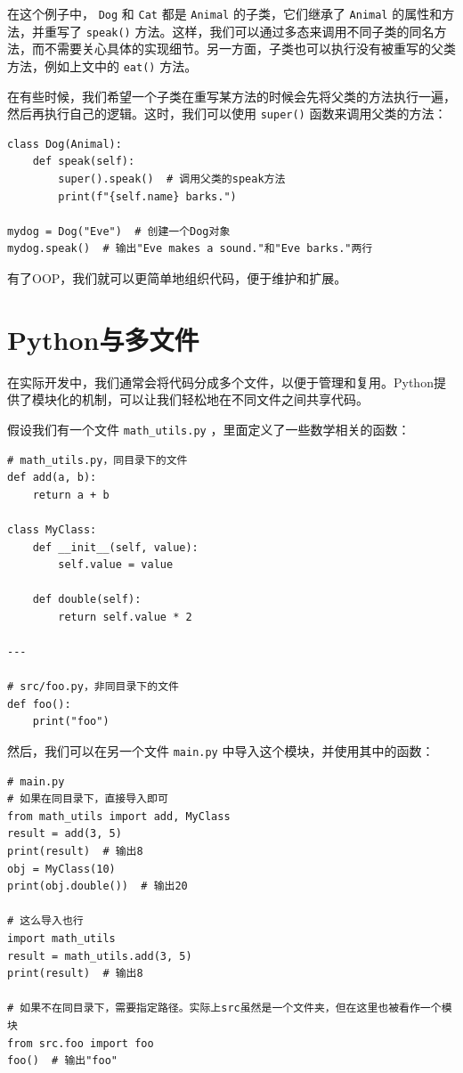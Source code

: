 在这个例子中， \texttt{Dog} 和 \texttt{Cat} 都是 \texttt{Animal} 的子类，它们继承了 \texttt{Animal} 的属性和方法，并重写了 \texttt{speak()} 方法。这样，我们可以通过多态来调用不同子类的同名方法，而不需要关心具体的实现细节。另一方面，子类也可以执行没有被重写的父类方法，例如上文中的 \texttt{eat()} 方法。

在有些时候，我们希望一个子类在重写某方法的时候会先将父类的方法执行一遍，然后再执行自己的逻辑。这时，我们可以使用 \texttt{super()} 函数来调用父类的方法：
\begin{verbatim}
class Dog(Animal):
    def speak(self):
        super().speak()  # 调用父类的speak方法
        print(f"{self.name} barks.")

mydog = Dog("Eve")  # 创建一个Dog对象
mydog.speak()  # 输出"Eve makes a sound."和"Eve barks."两行
\end{verbatim}

有了OOP，我们就可以更简单地组织代码，便于维护和扩展。

\section{Python与多文件}

在实际开发中，我们通常会将代码分成多个文件，以便于管理和复用。Python提供了模块化的机制，可以让我们轻松地在不同文件之间共享代码。

假设我们有一个文件 \texttt{math\_utils.py} ，里面定义了一些数学相关的函数：
\begin{verbatim}
# math_utils.py，同目录下的文件
def add(a, b):
    return a + b

class MyClass:
    def __init__(self, value):
        self.value = value

    def double(self):
        return self.value * 2

---

# src/foo.py，非同目录下的文件
def foo():
    print("foo")
\end{verbatim}

然后，我们可以在另一个文件 \texttt{main.py} 中导入这个模块，并使用其中的函数：
\begin{verbatim}
# main.py
# 如果在同目录下，直接导入即可
from math_utils import add, MyClass
result = add(3, 5)
print(result)  # 输出8
obj = MyClass(10)
print(obj.double())  # 输出20

# 这么导入也行
import math_utils
result = math_utils.add(3, 5)
print(result)  # 输出8

# 如果不在同目录下，需要指定路径。实际上src虽然是一个文件夹，但在这里也被看作一个模块
from src.foo import foo 
foo()  # 输出"foo"
\end{verbatim}

